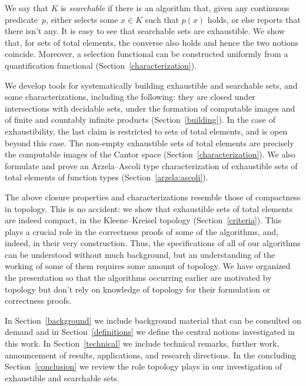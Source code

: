 \documentclass{LMCS}
\begin{document}
We say that $K$ is \emph{searchable} if there is an algorithm that,
given any continuous predicate~$p$, either selects some $x \in K$ such
that $p(x)$ holds, or else reports that there isn't any. It is easy to
see that searchable sets are exhaustible. We show that, for sets of
total elements, the converse also holds and hence the two notions
coincide.  Moreover, a selection functional can be constructed
uniformly from a quantification functional
(Section~\ref{characterization}).

We develop tools for systematically building exhaustible and
searchable sets, and some characterizations, including the following:
they are closed under intersections with decidable sets, under the
formation of computable images and of finite and countably infinite
products (Section~\ref{building}).  In the case of exhaustibility, the
last claim is restricted to sets of total elements, and is open beyond
this case.  The non-empty exhaustible sets of total elements are
precisely the computable images of the Cantor space (Section~\ref{characterization}). We also formulate and
prove an Arzela--Ascoli type characterization of exhaustible sets of
total elements of function types (Section~\ref{arzela:ascoli}).

The above closure properties and characterizations resemble those of
compactness in topology. This is no accident: we show that exhaustible
sets of total elements are indeed compact, in the Kleene--Kreisel
topology (Section~\ref{criteria}).  This plays a crucial role in the
correctness proofs of some of the algorithms, and, indeed, in their
very construction.  Thus, the specifications of all of our algorithms
can be understood without much background, but an understanding of the
working of some of them requires some amount of topology.  We have
organized the presentation so that the algorithms occurring earlier
are motivated by topology but don't rely on knowledge of topology for
their formulation or correctness proofs.

In Section~\ref{background} we include background material that can be
consulted on demand and in Section~\ref{definitions} we define the
central notions investigated in this work. In Section~\ref{technical}
we include technical remarks, further work, announcement of results,
applications, and research directions.  In the concluding
Section~\ref{conclusion} we review the role topology plays in our
investigation of exhaustible and searchable sets.
\end{document}
